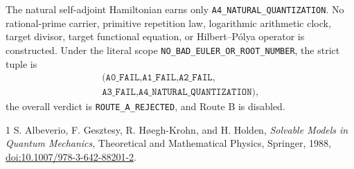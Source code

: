 \documentclass[10pt]{article}
\begin{document}
The natural self-adjoint Hamiltonian earns only
\texttt{A4\_NATURAL\_QUANTIZATION}.  No rational-prime carrier, primitive
repetition law, logarithmic arithmetic clock, target divisor, target
functional equation, or Hilbert--P\'olya operator is constructed.  Under the
literal scope \texttt{NO\_BAD\_EULER\_OR\_ROOT\_NUMBER}, the strict tuple is
\[
 \begin{gathered}
 \texttt{(A0\_FAIL,A1\_FAIL,A2\_FAIL,}\\[-2pt]
 \texttt{A3\_FAIL,A4\_NATURAL\_QUANTIZATION)},
 \end{gathered}
\]
the overall verdict is \texttt{ROUTE\_A\_REJECTED}, and Route B is disabled.
\fi

\begin{thebibliography}{1}
S. Albeverio, F. Gesztesy, R. H\o egh-Krohn, and H. Holden,
\emph{Solvable Models in Quantum Mechanics}, Theoretical and Mathematical
Physics, Springer, 1988,
\href{https://doi.org/10.1007/978-3-642-88201-2}
{doi:10.1007/978-3-642-88201-2}.
\end{thebibliography}
\end{document}
